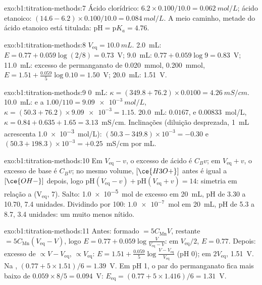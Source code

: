 \begin{solution}{exo:b1:titration-methods:7}
Ácido clorídrico: $6.2 \times 0.100/10.0 = \qty{0.062}{mol/L}$; ácido
etanoico: $(14.6 - 6.2) \times 0.100/10.0 = \qty{0.084}{mol/L}$. A meio
caminho, metade do ácido etanoico está titulada: $\mathrm{pH} = \mathrm{p}K_a = 4.76$.
\end{solution}

\begin{solution}{exo:b1:titration-methods:8}
$V_{\mathrm{eq}} = \qty{10.0}{mL}$. 2.0~mL: $E = 0.77 + 0.059\log(2/8) =
0.73$~V; 9.0~mL: $0.77 + 0.059\log 9 = 0.83$~V; 11.0~mL: excesso de
permanganato de \qty{0.020}{mmol},  \qty{0.200}{mmol}, $E = 1.51 +
\frac{0.059}{5}\log 0.10 = 1.50$~V; 20.0~mL: 1.51~V.
\end{solution}

\begin{solution}{exo:b1:titration-methods:9}
0~mL: $\kappa = (349.8 + 76.2) \times 0.0100 = \qty{4.26}{mS/cm}$.
10.0~mL:  e  a $1.00/110 = \qty{9.09e-3}{mol/L}$,
$\kappa = (50.3 + 76.2) \times \num{9.09e-3} = 1.15$. 20.0~mL: 
$0.0167$,  e  $0.00833$~mol/L, $\kappa = 0.84 + 0.635 + 1.65
= 3.13$~mS/cm. Inclinações (diluição desprezada, \qty{1}{mL} acrescenta
\qty{1.0e-3}{mol/L}): $(50.3 - 349.8) \times 10^{-3} = -0.30$ e
$(50.3 + 198.3) \times 10^{-3} = +0.25$~mS/cm por mL.
\end{solution}

\begin{solution}{exo:b1:titration-methods:10}
Em $V_{\mathrm{eq}} - v$, o excesso de ácido é $C_Bv$; em $V_{\mathrm{eq}} + v$,
o excesso de base é $C_Bv$; no mesmo volume, $[\ce{H3O+}]$ antes é igual
a $[\ce{OH-}]$ depois, logo $\mathrm{pH}(V_{\mathrm{eq}} - v) +
\mathrm{pH}(V_{\mathrm{eq}} + v) = 14$: simetria em relação a
(V$_{\mathrm{eq}}$, 7). Salto: \qty{1.0e-5}{mol} de excesso em
\qty{20}{mL}, pH de 3.30 a 10.70, 7.4 unidades. Dividindo por 100:
$\num{1.0e-7}$~mol em \qty{20}{mL}, pH de 5.3 a 8.7, 3.4 unidades: um
 muito menos nítido.
\end{solution}

\begin{solution}{exo:b1:titration-methods:11}
Antes:  formado $= 5C_{\mathrm{Mn}}V$,  restante $=
5C_{\mathrm{Mn}}(V_{\mathrm{eq}} - V)$, logo $E = 0.77 + 0.059\log\frac{V}{V_{\mathrm{eq}}
- V}$: em $V_{\mathrm{eq}}/2$, $E = 0.77$. Depois: excesso de  $\propto
V - V_{\mathrm{eq}}$,  $\propto V_{\mathrm{eq}}$: $E = 1.51 +
\frac{0.059}{5}\log\frac{V - V_{\mathrm{eq}}}{V_{\mathrm{eq}}}$ (pH 0); em
$2V_{\mathrm{eq}}$, 1.51~V. Na , $(0.77 + 5 \times 1.51)/6 =
1.39$~V. Em pH 1, o par do permanganato fica mais baixo de $0.059 \times 8/5 =
0.094$~V: $E_{\mathrm{eq}} = (0.77 + 5 \times 1.416)/6 = 1.31$~V.
\end{solution}

